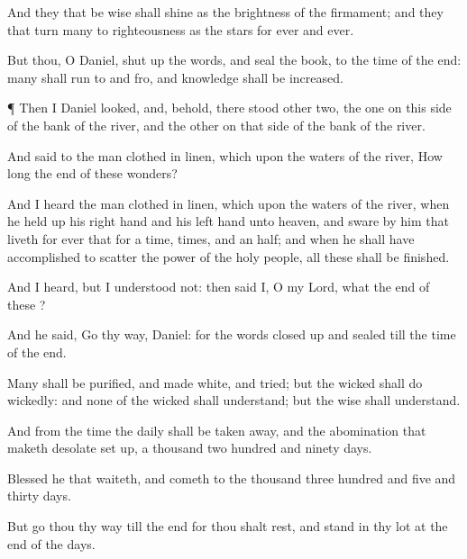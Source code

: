 {And they that be
wise shall
shine as the
brightness of the
firmament; and they that turn
many to
righteousness as the
stars for
ever and
ever.

But thou, O
Daniel, shut
up the
words, and
seal the
book,
{} to the
time of the
end:
many shall run to and
fro, and
knowledge shall be
increased.


\par }{\PP {}¶ Then I
Daniel
looked, and, behold, there
stood
other
two, the
one on this
side of the
bank of the
river, and the
other on that side of the
bank of the
river.

And
{}
said to the
man
clothed in
linen, which
{}
upon the
waters of the
river, How long
{} the
end of these
wonders?

And I
heard the
man
clothed in
linen, which
{}
upon the
waters of the
river, when he held
up his right
hand and his left
hand unto
heaven, and
sware by him that
liveth for
ever that
{} for a
time,
times, and an
half; and when he shall have
accomplished to
scatter the
power of the
holy
people, all these
{} shall be
finished.

And I
heard, but I
understood not: then
said I, O my
Lord, what
{} the
end of these
{}?

And he
said, Go thy
way,
Daniel: for the
words
{} closed
up and
sealed till the
time of the
end.

Many shall be
purified, and made
white, and
tried; but the
wicked shall do
wickedly: and none of the
wicked shall
understand; but the
wise shall
understand.

And from the
time
{} the
daily
{} shall be taken
away, and the
abomination that maketh
desolate set
up,
{} a
thousand two
hundred and
ninety
days.

Blessed
{} he that
waiteth, and
cometh to the
thousand
three
hundred and
five and
thirty
days.

But go thou thy
way till the
end
{} for thou shalt
rest, and
stand in thy
lot at the
end of the
days.


\par }
